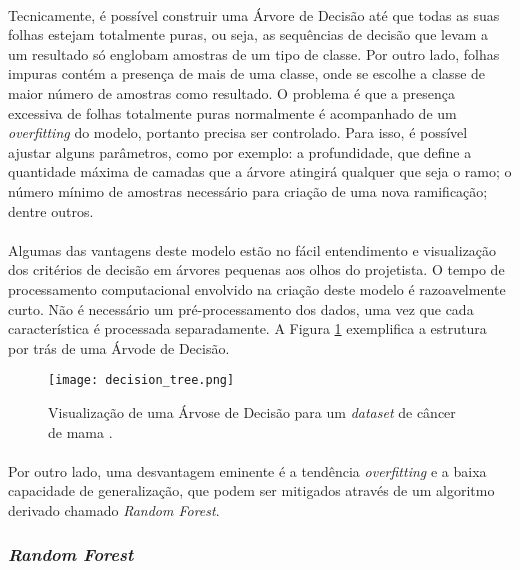 \paragraph{} Tecnicamente, é possível construir uma Árvore de Decisão até que todas as suas folhas estejam totalmente puras, ou seja, as sequências de decisão que levam a um resultado só englobam amostras de um tipo de classe. Por outro lado, folhas impuras contém a presença de mais de uma classe, onde se escolhe a classe de maior número de amostras como resultado. O problema é que a presença excessiva de folhas totalmente puras normalmente é acompanhado de um \textit{overfitting} do modelo, portanto precisa ser controlado. Para isso, é possível ajustar alguns parâmetros, como por exemplo: a profundidade, que define a quantidade máxima de camadas que a árvore atingirá qualquer que seja o ramo; o número mínimo de amostras necessário para criação de uma nova ramificação; dentre outros.

\paragraph{} Algumas das vantagens deste modelo estão no fácil entendimento e visualização dos critérios de decisão em árvores pequenas aos olhos do projetista. O tempo de processamento computacional envolvido na criação deste modelo é razoavelmente curto. Não é necessário um pré-processamento dos dados, uma vez que cada característica é processada separadamente. A Figura \ref{fig:9} exemplifica a estrutura por trás de uma Árvode de Decisão.

\begin{figure}[h]
    \texttt{[image: decision\_tree.png]}
    \centering
    \caption{Visualização de uma Árvose de Decisão para um \textit{dataset} de câncer de mama \cite{muller2016introduction}.}
    \label{fig:9}
\end{figure}

\paragraph{} Por outro lado, uma desvantagem eminente é a tendência \textit{overfitting} e a baixa capacidade de generalização, que podem ser mitigados através de um algoritmo derivado chamado \textit{Random Forest}.


\FloatBarrier
\subsubsection*{\textit{Random Forest}}

